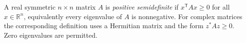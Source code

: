 
A real symmetric $n\times n$ matrix $A$ is \emph{positive semidefinite} if $x^{\mathsf T}Ax\ge0$ for all $x\in\mathbb R^n$, equivalently every eigenvalue of $A$ is nonnegative. For complex matrices the corresponding definition uses a Hermitian matrix and the form $z^*Az\ge0$. Zero eigenvalues are permitted.
